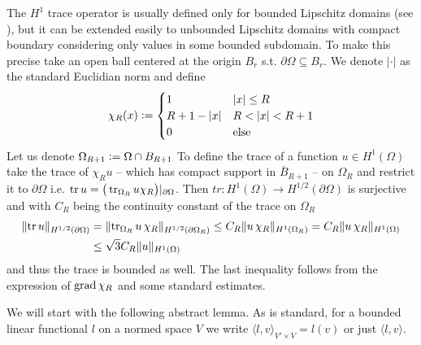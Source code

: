 \documentclass[../master_thesis.tex]{subfiles}
\begin{document}
\begin{remark}
    The $H^1$ trace operator is usually defined only for bounded Lipschitz domains 
    (see \cite[Thm.\,3.9]{monk}), but it can be extended easily to unbounded Lipschitz domains with 
    compact boundary considering only values in some bounded subdomain. 
    To make this precise take an open ball centered at the origin $B_r$
    s.t. $\partial \Omega \subseteq B_r$. We denote $|\cdot |$ as the standard 
    Euclidian norm and
    define 
    \begin{align*}
        \chi_R(x) \vcentcolon= 
        \begin{cases}
            1 & |x| \leq R
            \\ R + 1 - |x| & R < |x| < R+1
            \\ 0 & \text{else}
        \end{cases}        
    \end{align*}
    Let us denote 
    $\Omega_{R+1} \vcentcolon=  \Omega \cap B_{R+1}$
    To define the trace of a function $u \in H^1(\Omega)$ take the trace of
    $\chi_R u$ -- which has compact support in $\overline{B}_{R+1}$ -- 
    on $\Omega_R$ and restrict it to $\partial \Omega$ 
    i.e. $\operatorname{tr} u = \big( \operatorname{tr}_{\Omega_R} u\chi_R \big)|_{\partial \Omega}$.
    Then $tr: H^1(\Omega) \rightarrow H^{1/2}(\partial \Omega)$ is 
    surjective and with $C_R$ being the continuity constant of the trace on $\Omega_R$
    \begin{align*}
        \lVert \operatorname{tr} u \rVert _{H^{1/2}(\partial \Omega)}
        &= \lVert \operatorname{tr}_{\Omega_R} u\,\chi_R  \rVert _{H^{1/2}(\partial \Omega_R)}
        \leq C_R \lVert u\,\chi_R  \rVert _{H^1(\Omega_R)}
        = C_R \lVert u\,\chi_R  \rVert _{H^1(\Omega)}
        \\ &\leq \sqrt{3} C_R \lVert u  \rVert _{H^1(\Omega)}
    \end{align*}
    and thus the trace is bounded as well. The last inequality follows from 
    the expression of $\operatorname{grad} \chi_R$ and some standard estimates.
\end{remark}

We will start with the following abstract lemma. As is standard, for a bounded linear 
functional $l$ on a normed space $V$ we write $\langle l, v \rangle_{V'\times V} = l(v)$ 
or just $\langle l, v \rangle$.
\end{document}
